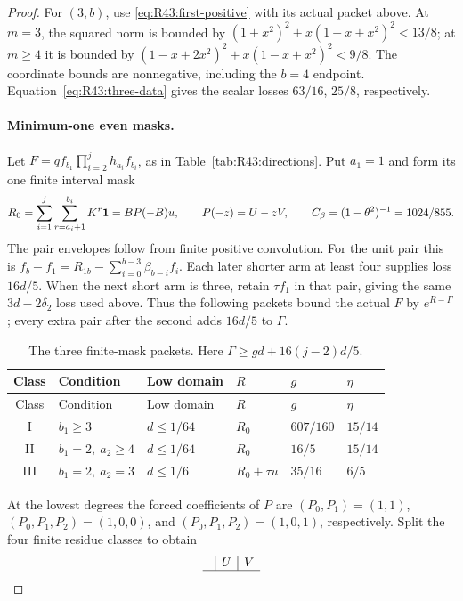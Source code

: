 \begin{proof}
For \((3,b)\), use \eqref{eq:R43:first-positive} with its actual
packet above. At \(m=3\), the squared norm is bounded by
\((1+x^2)^2+x(1-x+x^2)^2<13/8\); at \(m\ge4\) it is bounded by
\((1-x+2x^2)^2+x(1-x+x^2)^2<9/8\).
The coordinate bounds are nonnegative, including the \(b=4\) endpoint.
Equation~\eqref{eq:R43:three-data} gives the scalar losses
\(63/16\), \(25/8\), respectively.

\paragraph{Minimum-one even masks.}\label{part:R43:even-mask}
Let \(F=qf_{b_1}\prod_{i=2}^j h_{a_i}f_{b_i}\), as in
Table~\ref{tab:R43:directions}. Put \(a_1=1\) and form its one
finite interval mask
\[
 R_0=\sum_{i=1}^j\sum_{r=a_i+1}^{b_i}K^r\mathbf1
     =BP(-B)u,
 \qquad P(-z)=U-zV,\qquad C_\beta=(1-\theta^2)^{-1}=1024/855.
\]
The pair envelopes follow from finite positive convolution. For the
unit pair this is
\(f_b-f_1=R_{1b}-\sum_{i=0}^{b-3}\beta_{b-i}f_i\).
Each later shorter arm at least four supplies loss \(16d/5\).
When the next short arm is three, retain \(\tau f_1\) in that
pair, giving the same \(3d-2\delta_2\) loss used above.
Thus the following packets bound the actual \(F\) by
\(e^{R-\Gamma}\); every extra pair after the second adds \(16d/5\)
to \(\Gamma\).
\begin{longtable}{@{}clllll@{}}
\caption{The three finite-mask packets. Here \(\Gamma\ge g d+16(j-2)d/5\).}
\label{tab:R43:mask-packets}\\
\toprule
Class&Condition&Low domain&\(R\)&\(g\)&\(\eta\)\\\midrule
\endfirsthead
\toprule Class&Condition&Low domain&\(R\)&\(g\)&\(\eta\)\\\midrule
\endhead\bottomrule\endfoot
I&\(b_1\ge3\)&\(d\le1/64\)&\(R_0\)&\(607/160\)&\(15/14\)\\
II&\(b_1=2,\ a_2\ge4\)&\(d\le1/64\)&\(R_0\)&\(16/5\)&\(15/14\)\\
III&\(b_1=2,\ a_2=3\)&\(d\le1/6\)&\(R_0+\tau u\)&\(35/16\)&\(6/5\)\\
\end{longtable}
At the lowest degrees the forced coefficients of \(P\) are
\((P_0,P_1)=(1,1)\), \((P_0,P_1,P_2)=(1,0,0)\), and
\((P_0,P_1,P_2)=(1,0,1)\), respectively.
Split the four finite residue classes to obtain
\begin{equation}\label{eq:R43:forced-coordinates}
\begin{array}{c|c|c}
 &U&V\\\hline

\end{array}
\end{equation}
\end{proof}
